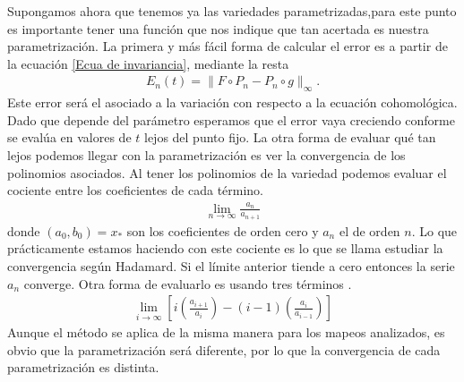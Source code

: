 Supongamos ahora que tenemos ya las variedades parametrizadas,para este punto es importante tener una función que nos indique que tan acertada es nuestra parametrización. La primera y más fácil forma de calcular el error es a partir de la ecuación \ref{Ecua de invariancia}, mediante la resta
\begin{eqnarray}
E_{n}(t) = \parallel F \circ P_{n} - P_{n} \circ g \parallel_{\infty}.  \label{Ecua de invariancia resta}
\end{eqnarray}
Este error será el asociado a la variación con respecto a la ecuación cohomológica. Dado que depende del parámetro esperamos que el error vaya creciendo conforme se evalúa en valores de $t$ lejos del punto fijo. La otra forma de evaluar qué tan lejos podemos llegar con la parametrización es ver la convergencia de los polinomios asociados. Al tener los polinomios de la variedad podemos evaluar el cociente entre los coeficientes de cada término.
\begin{eqnarray}
\lim_{n\rightarrow\infty}\frac{a_{n}}{a_{n+1}}\label{hadamard}
\end{eqnarray} 
donde $(a_{0},b_{0})=x_{*}$ son los coeficientes de orden cero y $a_{n}$ el de orden $n$. Lo que prácticamente estamos haciendo con este cociente es lo que se llama estudiar la convergencia según Hadamard. Si el límite anterior tiende a cero entonces la serie $a_{n}$ converge. Otra forma de evaluarlo es usando tres términos \citep{Chang}.
\begin{eqnarray}
\lim_{i\rightarrow\infty} \left[ i\left(\frac{a_{i+1}}{a_{i}}\right)-(i-1)\left(\frac{a_{i}}{a_{i-1}}\right) \right] \label{tres terminos}
\end{eqnarray}
Aunque el método se aplica de la misma manera para los mapeos analizados, es obvio que la parametrización será diferente, por lo que la convergencia de cada parametrización es distinta. 